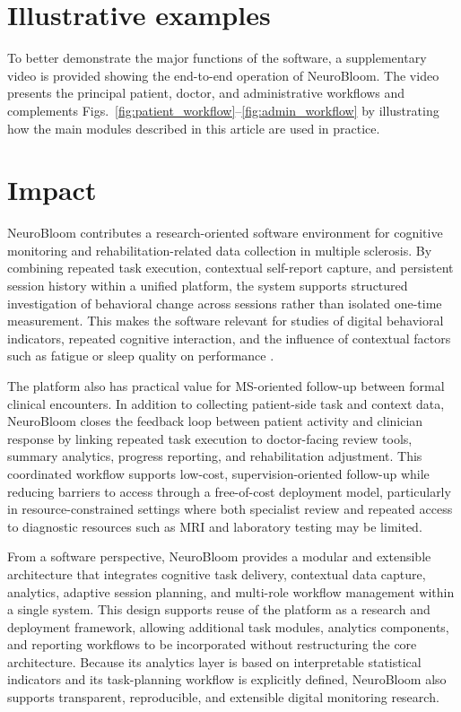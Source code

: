 \documentclass[preprint,12pt,a4paper]{elsarticle}
\begin{document}
\section{Illustrative examples}
To better demonstrate the major functions of the software, a supplementary video is provided showing the end-to-end operation of NeuroBloom. The video presents the principal patient, doctor, and administrative workflows and complements Figs.~\ref{fig:patient_workflow}--\ref{fig:admin_workflow} by illustrating how the main modules described in this article are used in practice.


\section{Impact}
NeuroBloom contributes a research-oriented software environment for cognitive monitoring and rehabilitation-related data collection in multiple sclerosis. By combining repeated task execution, contextual self-report capture, and persistent session history within a unified platform, the system supports structured investigation of behavioral change across sessions rather than isolated one-time measurement. This makes the software relevant for studies of digital behavioral indicators, repeated cognitive interaction, and the influence of contextual factors such as fatigue or sleep quality on performance \cite{insel2017,coravos2019}.

The platform also has practical value for MS-oriented follow-up between formal clinical encounters. In addition to collecting patient-side task and context data, NeuroBloom closes the feedback loop between patient activity and clinician response by linking repeated task execution to doctor-facing review tools, summary analytics, progress reporting, and rehabilitation adjustment. This coordinated workflow supports low-cost, supervision-oriented follow-up while reducing barriers to access through a free-of-cost deployment model, particularly in resource-constrained settings where both specialist review and repeated access to diagnostic resources such as MRI and laboratory testing may be limited.

From a software perspective, NeuroBloom provides a modular and extensible architecture that integrates cognitive task delivery, contextual data capture, analytics, adaptive session planning, and multi-role workflow management within a single system. This design supports reuse of the platform as a research and deployment framework, allowing additional task modules, analytics components, and reporting workflows to be incorporated without restructuring the core architecture. Because its analytics layer is based on interpretable statistical indicators and its task-planning workflow is explicitly defined, NeuroBloom also supports transparent, reproducible, and extensible digital monitoring research.
\end{document}
